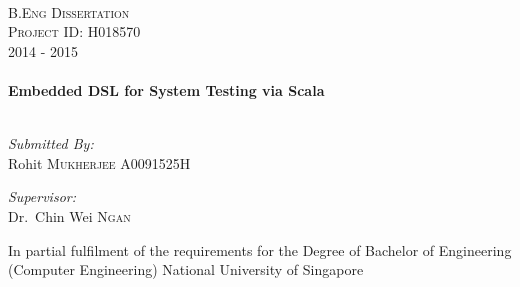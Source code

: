 \begin{titlepage}
\begin{center}

\\[5cm]
\textsc{\Large B.Eng Dissertation}\\[0.3cm]
\textsc{\Large Project ID: H018570}\\[0.3cm]
\textsc{\Large 2014 - 2015}\\[0.3cm]

\HRule \\[0.4cm]
{ \huge \bfseries Embedded DSL for System Testing via Scala \\[0.4cm] }
\HRule \\[1.0cm]

\noindent
\begin{minipage}{0.4\textwidth}
\begin{flushleft} \large
\emph{Submitted By:}\\
Rohit \textsc{Mukherjee}
A0091525H
\end{flushleft}
\end{minipage}%
\begin{minipage}{0.4\textwidth}
\begin{flushright} \large
\emph{Supervisor:} \\
Dr.~Chin Wei \textsc{Ngan}
\end{flushright}
\end{minipage}
\vfill

\vspace{8 mm}
In partial fulfilment of the requirements for the Degree of Bachelor of Engineering (Computer Engineering) National University of Singapore 
\bigskip

\end{center}
\end{titlepage}